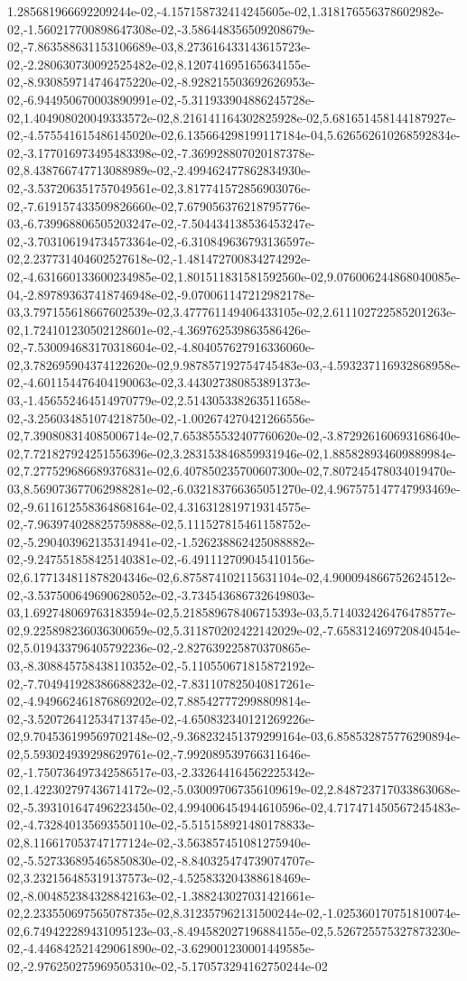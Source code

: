 1.285681966692209244e-02,-4.157158732414245605e-02,1.318176556378602982e-02,-1.560217700898647308e-02,-3.586448356509208679e-02,-7.863588631153106689e-03,8.273616433143615723e-02,-2.280630730092525482e-02,8.120741695165634155e-02,-8.930859714746475220e-02,-8.928215503692626953e-02,-6.944950670003890991e-02,-5.311933904886245728e-02,1.404908020049333572e-02,8.216141164302825928e-02,5.681651458144187927e-02,-4.575541615486145020e-02,6.135664298199117184e-04,5.626562610268592834e-02,-3.177016973495483398e-02,-7.369928807020187378e-02,8.438766747713088989e-02,-2.499462477862834930e-02,-3.537206351757049561e-02,3.817741572856903076e-02,-7.619157433509826660e-02,7.679056376218795776e-03,-6.739968806505203247e-02,-7.504434138536453247e-02,-3.703106194734573364e-02,-6.310849636793136597e-02,2.237731404602527618e-02,-1.481472700834274292e-02,-4.631660133600234985e-02,1.801511831581592560e-02,9.076006244868040085e-04,-2.897893637418746948e-02,-9.070061147212982178e-03,3.797155618667602539e-02,3.477761149406433105e-02,2.611102722585201263e-02,1.724101230502128601e-02,-4.369762539863586426e-02,-7.530094683170318604e-02,-4.804057627916336060e-02,3.782695904374122620e-02,9.987857192754745483e-03,-4.593237116932868958e-02,-4.601154476404190063e-02,3.443027380853891373e-03,-1.456552464514970779e-02,2.514305338263511658e-02,-3.256034851074218750e-02,-1.002674270421266556e-02,7.390808314085006714e-02,7.653855532407760620e-02,-3.872926160693168640e-02,7.721827924251556396e-02,3.283153846859931946e-02,1.885828934609889984e-02,7.277529686689376831e-02,6.407850235700607300e-02,7.807245478034019470e-03,8.569073677062988281e-02,-6.032183766365051270e-02,4.967575147747993469e-02,-9.611612558364868164e-02,4.316312819719314575e-02,-7.963974028825759888e-02,5.111527815461158752e-02,-5.290403962135314941e-02,-1.526238862425088882e-02,-9.247551858425140381e-02,-6.491112709045410156e-02,6.177134811878204346e-02,6.875874102115631104e-02,4.900094866752624512e-02,-3.537500649690628052e-02,-3.734543686732649803e-03,1.692748069763183594e-02,5.218589678406715393e-03,5.714032426476478577e-02,9.225898236036300659e-02,5.311870202422142029e-02,-7.658312469720840454e-02,5.019433796405792236e-02,-2.827639225870370865e-03,-8.308845758438110352e-02,-5.110550671815872192e-02,-7.704941928386688232e-02,-7.831107825040817261e-02,-4.949662461876869202e-02,7.885427772998809814e-02,-3.520726412534713745e-02,-4.650832340121269226e-02,9.704536199569702148e-02,-9.368232451379299164e-03,6.858532875776290894e-02,5.593024939298629761e-02,-7.992089539766311646e-02,-1.750736497342586517e-03,-2.332644164562225342e-02,1.422302797436714172e-02,-5.030097067356109619e-02,2.848723717033863068e-02,-5.393101647496223450e-02,4.994006454944610596e-02,4.717471450567245483e-02,-4.732840135693550110e-02,-5.515158921480178833e-02,8.116617053747177124e-02,-3.563857451081275940e-02,-5.527336895465850830e-02,-8.840325474739074707e-02,3.232156485319137573e-02,-4.525833204388618469e-02,-8.004852384328842163e-02,-1.388243027031421661e-02,2.233550697565078735e-02,8.312357962131500244e-02,-1.025360170751810074e-02,6.749422289431095123e-03,-8.494582027196884155e-02,5.526725575327873230e-02,-4.446842521429061890e-02,-3.629001230001449585e-02,-2.976250275969505310e-02,-5.170573294162750244e-02
